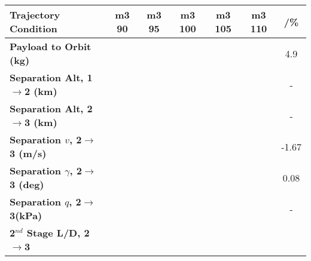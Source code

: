 \begin{tabular}{l c c c c c c} 
	\hline \textbf{Trajectory Condition}
	&m3 90
	&m3 95
	&m3 100
	&m3 105
	&m3 110
	& /\%
	\\
	\hline \textbf{Payload to Orbit (kg)}
	& \PayloadToOrbitmThreeNinetyNoReturn
	& \PayloadToOrbitmThreeNinetyFiveNoReturn
	& \PayloadToOrbitmThreeStandardNoReturn
	& \PayloadToOrbitmThreeOneHundredFiveNoReturn
	& \PayloadToOrbitmThreeOneHundredTenNoReturn
	&4.9
	\\
	\textbf{Separation Alt, 1$\rightarrow$2 (km)}
	& \firstsecondSeparationAltmThreeNinetyNoReturn
	& \firstsecondSeparationAltmThreeNinetyFiveNoReturn
	& \firstsecondSeparationAltmThreeStandardNoReturn
	& \firstsecondSeparationAltmThreeOneHundredFiveNoReturn
	& \firstsecondSeparationAltmThreeOneHundredTenNoReturn
	& -
	\\
	\textbf{Separation Alt, 2$\rightarrow$3 (km)}
	& \secondthirdSeparationAltmThreeNinetyNoReturn
	& \secondthirdSeparationAltmThreeNinetyFiveNoReturn
	& \secondthirdSeparationAltmThreeStandardNoReturn
	& \secondthirdSeparationAltmThreeOneHundredFiveNoReturn
	& \secondthirdSeparationAltmThreeOneHundredTenNoReturn
	& -
	\\
	\textbf{Separation $v$, 2$\rightarrow$3 (m/s)}
	& \secondthirdSeparationvmThreeNinetyNoReturn
	& \secondthirdSeparationvmThreeNinetyFiveNoReturn
	& \secondthirdSeparationvmThreeStandardNoReturn
	& \secondthirdSeparationvmThreeOneHundredFiveNoReturn
	& \secondthirdSeparationvmThreeOneHundredTenNoReturn
	&-1.67
	\\
	\textbf{Separation $\gamma$, 2$\rightarrow$3 (deg)}
	& \secondthirdSeparationgammamThreeNinetyNoReturn
	& \secondthirdSeparationgammamThreeNinetyFiveNoReturn
	& \secondthirdSeparationgammamThreeStandardNoReturn
	& \secondthirdSeparationgammamThreeOneHundredFiveNoReturn
	& \secondthirdSeparationgammamThreeOneHundredTenNoReturn
	&0.08
	\\
	\textbf{Separation $q$, 2$\rightarrow$3(kPa)}
	& \secondthirdSeparationqmThreeNinetyNoReturn
	& \secondthirdSeparationqmThreeNinetyFiveNoReturn
	& \secondthirdSeparationqmThreeStandardNoReturn
	& \secondthirdSeparationqmThreeOneHundredFiveNoReturn
	& \secondthirdSeparationqmThreeOneHundredTenNoReturn
	& -
	\\
	\textbf{2$^{nd}$ Stage L/D, 2$\rightarrow$3}
	& \secondthirdSeparationLDmThreeNinetyNoReturn
	& \secondthirdSeparationLDmThreeNinetyFiveNoReturn
	& \secondthirdSeparationLDmThreeStandardNoReturn
	& \secondthirdSeparationLDmThreeOneHundredFiveNoReturn
	& \secondthirdSeparationLDmThreeOneHundredTenNoReturn

\end{tabular}
